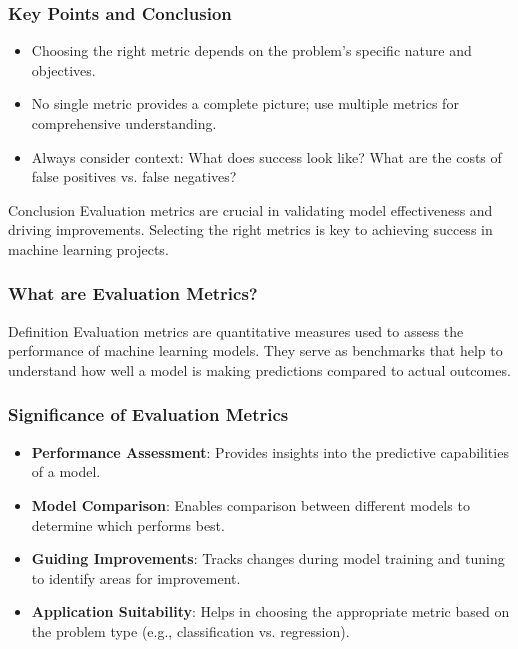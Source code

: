 \documentclass[aspectratio=169]{beamer}
\begin{document}
\begin{frame}[fragile]
    \frametitle{Key Points and Conclusion}
    \begin{itemize}
        \item Choosing the right metric depends on the problem's specific nature and objectives.
        \item No single metric provides a complete picture; use multiple metrics for comprehensive understanding.
        \item Always consider context: What does success look like? What are the costs of false positives vs. false negatives?
    \end{itemize}

    \begin{block}{Conclusion}
        Evaluation metrics are crucial in validating model effectiveness and driving improvements. Selecting the right metrics is key to achieving success in machine learning projects.
    \end{block}
\end{frame}

\begin{frame}[fragile]
    \frametitle{What are Evaluation Metrics?}
    \begin{block}{Definition}
        Evaluation metrics are quantitative measures used to assess the performance of machine learning models. They serve as benchmarks that help to understand how well a model is making predictions compared to actual outcomes.
    \end{block}
\end{frame}

\begin{frame}[fragile]
    \frametitle{Significance of Evaluation Metrics}
    \begin{itemize}
        \item \textbf{Performance Assessment}: Provides insights into the predictive capabilities of a model.
        \item \textbf{Model Comparison}: Enables comparison between different models to determine which performs best.
        \item \textbf{Guiding Improvements}: Tracks changes during model training and tuning to identify areas for improvement.
        \item \textbf{Application Suitability}: Helps in choosing the appropriate metric based on the problem type (e.g., classification vs. regression).
    \end{itemize}
\end{frame}
\end{document}

